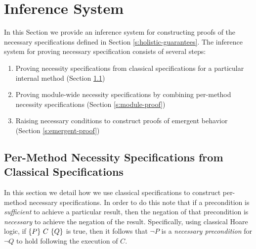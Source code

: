 \section{Inference System}  
\label{s:inference}

In this Section we provide an inference system for constructing 
proofs of the necessary specifications defined in Section \ref{s:holistic-guarantees}.
The inference system for proving necessary specification consists of several steps:
\begin{enumerate}
\item
Proving necessity specifications from classical specifications for a particular internal method (Section \ref{s:classical-proof})
\item
Proving module-wide necessity specifications by combining per-method necessity specifications (Section \ref{s:module-proof})
\item
Raising necessary conditions to construct proofs of emergent behavior (Section \ref{s:emergent-proof})
\end{enumerate}


\subsection{Per-Method Necessity Specifications from Classical Specifications}
\label{s:classical-proof}
In this section we detail how we use classical specifications
to construct per-method necessary specifications. In order to do this
note that if a precondition is \emph{sufficient}
to achieve a particular result, then the negation of that precondition
is \emph{necessary} to achieve the negation of the result. Specifically, 
using classical Hoare logic, if $\{P\}\ C\ \{Q\}$ is true, then 
it follows that $\neg P$ is a \emph{necessary precondition} for $\neg Q$ to 
hold following the execution of $C$.

